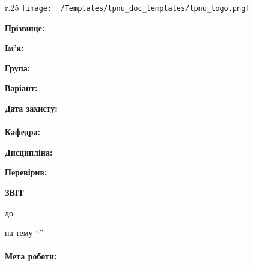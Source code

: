 \Margins
\begin{wrapfigure}[3]{r}{.25\textwidth}
\texttt{[image: ~/Templates/lpnu\_doc\_templates/lpnu\_logo.png]} %
\end{wrapfigure}

\noindent\textbf{Прізвище:} \Lname

\noindent\textbf{Ім'я:} \Fname

\noindent\textbf{Група:} \Group

\noindent\textbf{Варіант:} \Variant

\noindent\textbf{Дата захисту:} \Date
\\\\
\noindent\textbf{Кафедра:} \Department

\noindent\textbf{Дисципліна:} \Discipline

\noindent\textbf{Перевірив:} \Reviser


\begin{center}
	\textbf{ЗВІТ}

	до \Work

	на тему ``\Topic''
\end{center}
\paragraph{Мета роботи:}
